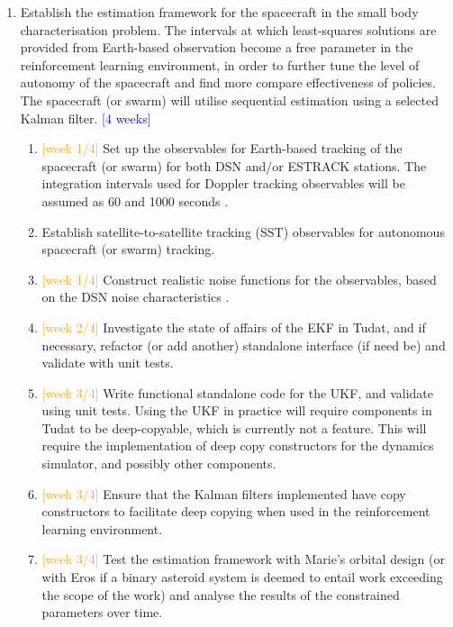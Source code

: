 \begin{enumerate}
    \item Establish the estimation framework for the spacecraft in the small body characterisation problem. The intervals at which least-squares solutions are provided from Earth-based observation become a free parameter in the reinforcement learning environment, in order to further tune the level of autonomy of the spacecraft and find more compare effectiveness of policies. The spacecraft (or swarm) will utilise sequential estimation using a selected Kalman filter. \textcolor{blue}{[4 weeks]}
    \begin{enumerate}
        \item \textcolor{orange}{[week 1/4]} Set up the observables for Earth-based tracking of the spacecraft (or swarm) for both \gls{DSN} and/or \gls{ESTRACK} stations. The integration intervals used for Doppler tracking observables will be assumed as 60 and 1000 seconds \cite{Dirkx2019}. 
        \item Establish satellite-to-satellite tracking (SST) observables \cite{Kakihara2016, Hill2006} for autonomous spacecraft (or swarm) tracking. 
        \item \textcolor{orange}{[week 1/4]} Construct realistic noise functions for the observables, based on the \gls{DSN} noise characteristics \cite[p.~33]{Thorton2003}.
        \item \textcolor{orange}{[week 2/4]} Investigate the state of affairs of the \gls{EKF} in Tudat, and if necessary, refactor (or add another) standalone interface (if need be) and validate with unit tests.
        \item \textcolor{orange}{[week 3/4]} Write functional standalone code for the \gls{UKF}, and validate using unit tests. Using the \gls{UKF} in practice will require components in Tudat to be deep-copyable, which is currently not a feature. This will require the implementation of deep copy constructors for the dynamics simulator, and possibly other components.
        \item \textcolor{orange}{[week 3/4]} Ensure that the Kalman filters implemented have copy constructors to facilitate deep copying when used in the reinforcement learning environment.
        \item \textcolor{orange}{[week 3/4]} Test the estimation framework with Marie's orbital design (or with Eros if a binary asteroid system is deemed to entail work exceeding the scope of the work) and analyse the results of the constrained parameters over time.
    \end{enumerate}


\end{enumerate}
